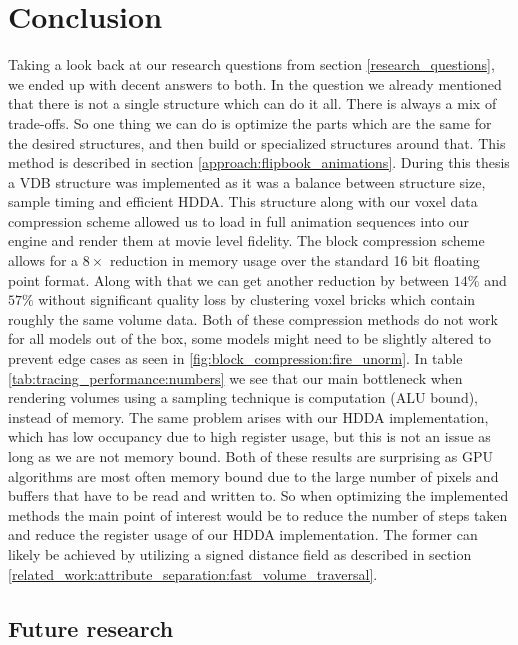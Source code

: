 \section{Conclusion} \label{conclusion}
Taking a look back at our research questions from section \ref{research_questions}, we ended up with decent answers to both. In the question we already mentioned that there is not a single structure which can do it all. There is always a mix of trade-offs. So one thing we can do is optimize the parts which are the same for the desired structures, and then build or specialized structures around that. This method is described in section \ref{approach:flipbook_animations}. During this thesis a VDB structure was implemented as it was a balance between structure size, sample timing and efficient HDDA. This structure along with our voxel data compression scheme allowed us to load in full animation sequences into our engine and render them at movie level fidelity. The block compression scheme allows for a $8\times$ reduction in memory usage over the standard 16 bit floating point format. Along with that we can get another reduction by between $14\%$ and $57\%$ without significant quality loss by clustering voxel bricks which contain roughly the same volume data. Both of these compression methods do not work for all models out of the box, some models might need to be slightly altered to prevent edge cases as seen in \ref{fig:block_compression:fire_unorm}. In table \ref{tab:tracing_performance:numbers} we see that our main bottleneck when rendering volumes using a sampling technique is computation (ALU bound), instead of memory. The same problem arises with our HDDA implementation, which has low occupancy due to high register usage, but this is not an issue as long as we are not memory bound. Both of these results are surprising as GPU algorithms are most often memory bound due to the large number of pixels and buffers that have to be read and written to. So when optimizing the implemented methods the main point of interest would be to reduce the number of steps taken and reduce the register usage of our HDDA implementation. The former can likely be achieved by utilizing a signed distance field as described in section \ref{related_work:attribute_separation:fast_volume_traversal}.

\subsection{Future research} \label{conclusion:future_research}

